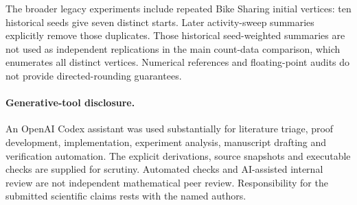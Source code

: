 The broader legacy experiments include repeated Bike Sharing initial
vertices: ten historical seeds give seven distinct starts. Later
activity-sweep summaries explicitly remove those duplicates. Those
historical seed-weighted summaries are not used as independent
replications in the main count-data comparison, which enumerates all
distinct vertices. Numerical references and floating-point audits
do not provide directed-rounding guarantees.

\paragraph{Generative-tool disclosure.}
An OpenAI Codex assistant was used substantially for literature triage,
proof development, implementation, experiment analysis, manuscript
drafting and verification automation. The explicit derivations, source
snapshots and executable checks are supplied for scrutiny. Automated
checks and AI-assisted internal review are not independent mathematical
peer review. Responsibility for the submitted scientific claims rests
with the named authors.
